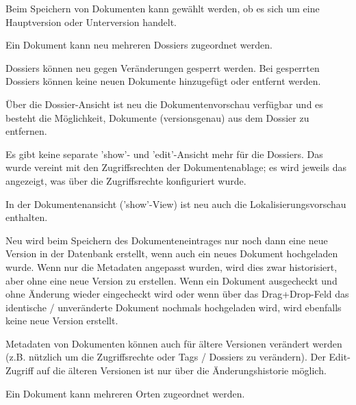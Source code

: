 \begin{compactitem}
	\item Beim Speichern von Dokumenten kann gewählt werden, ob es sich um eine Hauptversion oder Unterversion handelt.
	\item Ein Dokument kann neu mehreren Dossiers zugeordnet werden.
	\item Dossiers können neu gegen Veränderungen gesperrt werden. Bei gesperrten Dossiers können keine neuen Dokumente hinzugefügt oder entfernt werden.
	\item Über die Dossier-Ansicht ist neu die Dokumentenvorschau verfügbar und es besteht die Möglichkeit, Dokumente (versionsgenau) aus dem Dossier zu entfernen.
	\item Es gibt keine separate 'show'- und 'edit'-Ansicht mehr für die Dossiers. Das wurde vereint mit den Zugriffsrechten der Dokumentenablage; es wird jeweils das angezeigt, was über die Zugriffsrechte konfiguriert wurde.
	\item In der Dokumentenansicht ('show'-View) ist neu auch die Lokalisierungsvorschau enthalten.
	\item Neu wird beim Speichern des Dokumenteneintrages nur noch dann eine neue Version in der Datenbank erstellt, wenn auch ein neues Dokument hochgeladen wurde. Wenn nur die Metadaten angepasst wurden, wird dies zwar historisiert, aber ohne eine neue Version zu erstellen. Wenn ein Dokument ausgecheckt und ohne Änderung wieder eingecheckt wird oder wenn über das Drag+Drop-Feld das identische / unveränderte Dokument nochmals hochgeladen wird, wird ebenfalls keine neue Version erstellt.
	\item Metadaten von Dokumenten können auch für ältere Versionen verändert werden (z.B. nützlich um die Zugriffsrechte oder Tags / Dossiers zu verändern). Der Edit-Zugriff auf die älteren Versionen ist nur über die Änderungshistorie möglich.
	\item Ein Dokument kann mehreren Orten zugeordnet werden. 
\end{compactitem}

